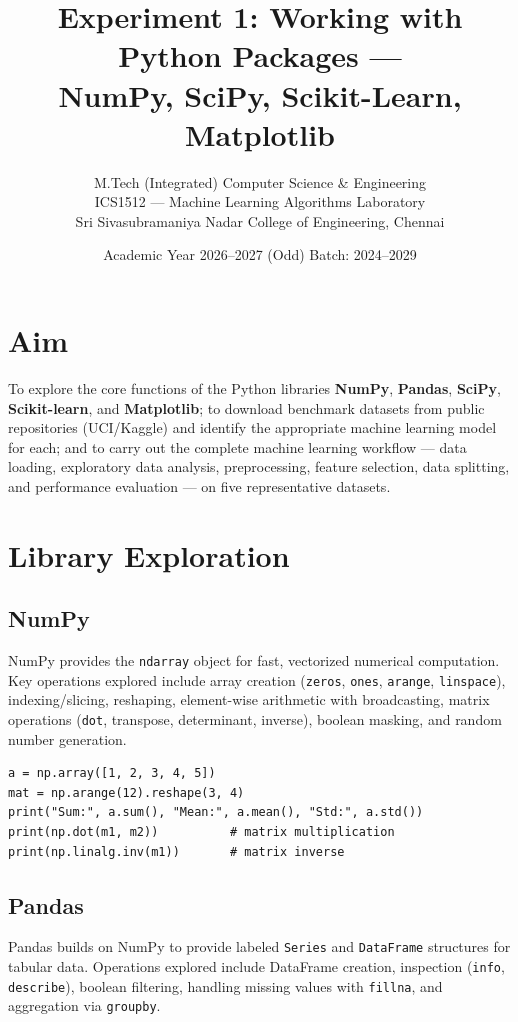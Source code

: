 \documentclass[11pt,a4paper]{article}
\title{\textbf{Experiment 1: Working with Python Packages --- \\ NumPy, SciPy, Scikit-Learn, Matplotlib}}
\author{
  M.Tech (Integrated) Computer Science \& Engineering \\
  ICS1512 --- Machine Learning Algorithms Laboratory \\
  Sri Sivasubramaniya Nadar College of Engineering, Chennai
}
\date{Academic Year 2026--2027 (Odd) \quad Batch: 2024--2029}
\begin{document}
\maketitle

\section*{Aim}
To explore the core functions of the Python libraries \textbf{NumPy}, \textbf{Pandas}, \textbf{SciPy},
\textbf{Scikit-learn}, and \textbf{Matplotlib}; to download benchmark datasets from public repositories
(UCI/Kaggle) and identify the appropriate machine learning model for each; and to carry out the complete
machine learning workflow --- data loading, exploratory data analysis, preprocessing, feature selection,
data splitting, and performance evaluation --- on five representative datasets.

\section{Library Exploration}

\subsection{NumPy}
NumPy provides the \texttt{ndarray} object for fast, vectorized numerical computation. Key operations
explored include array creation (\texttt{zeros}, \texttt{ones}, \texttt{arange}, \texttt{linspace}),
indexing/slicing, reshaping, element-wise arithmetic with broadcasting, matrix operations
(\texttt{dot}, transpose, determinant, inverse), boolean masking, and random number generation.

\begin{lstlisting}
a = np.array([1, 2, 3, 4, 5])
mat = np.arange(12).reshape(3, 4)
print("Sum:", a.sum(), "Mean:", a.mean(), "Std:", a.std())
print(np.dot(m1, m2))          # matrix multiplication
print(np.linalg.inv(m1))       # matrix inverse
\end{lstlisting}

\subsection{Pandas}
Pandas builds on NumPy to provide labeled \texttt{Series} and \texttt{DataFrame} structures for
tabular data. Operations explored include DataFrame creation, inspection (\texttt{info}, \texttt{describe}),
boolean filtering, handling missing values with \texttt{fillna}, and aggregation via \texttt{groupby}.
\end{document}

